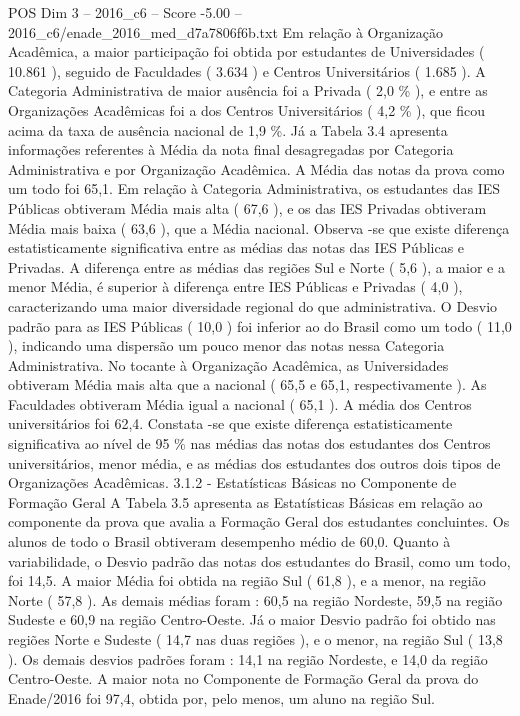 \begin{textsample}{POS Dim 3 – 2016\_c6 – Score -5.00 – 2016\_c6/enade\_2016\_med\_d7a7806f6b.txt}
Em relação à Organização Acadêmica, a maior participação foi obtida por estudantes de Universidades ( 10.861 ), seguido de Faculdades ( 3.634 ) e Centros Universitários ( 1.685 ).
A Categoria Administrativa de maior ausência foi a Privada ( 2,0 \% ), e entre as Organizações Acadêmicas foi a dos Centros Universitários ( 4,2 \% ), que ficou acima da taxa de ausência nacional de 1,9 \%.
Já a Tabela 3.4 apresenta informações referentes à Média da nota final desagregadas por Categoria Administrativa e por Organização Acadêmica.
A Média das notas da prova como um todo foi 65,1.
Em relação à Categoria Administrativa, os estudantes das IES Públicas obtiveram Média mais alta ( 67,6 ), e os das IES Privadas obtiveram Média mais baixa ( 63,6 ), que a Média nacional.
Observa -se que existe diferença estatisticamente significativa entre as médias das notas das IES Públicas e Privadas.
A diferença entre as médias das regiões Sul e Norte ( 5,6 ), a maior e a menor Média, é superior à diferença entre IES Públicas e Privadas ( 4,0 ), caracterizando uma maior diversidade regional do que administrativa.
O Desvio padrão para as IES Públicas ( 10,0 ) foi inferior ao do Brasil como um todo ( 11,0 ), indicando uma dispersão um pouco menor das notas nessa Categoria Administrativa.
No tocante à Organização Acadêmica, as Universidades obtiveram Média mais alta que a nacional ( 65,5 e 65,1, respectivamente ).
As Faculdades obtiveram Média igual a nacional ( 65,1 ).
A média dos Centros universitários foi 62,4.
Constata -se que existe diferença estatisticamente significativa ao nível de 95 \% nas médias das notas dos estudantes dos Centros universitários, menor média, e as médias dos estudantes dos outros dois tipos de Organizações Acadêmicas. 3.1.2 - Estatísticas Básicas no Componente de Formação Geral A Tabela 3.5 apresenta as Estatísticas Básicas em relação ao componente da prova que avalia a Formação Geral dos estudantes concluintes.
Os alunos de todo o Brasil obtiveram desempenho médio de 60,0.
Quanto à variabilidade, o Desvio padrão das notas dos estudantes do Brasil, como um todo, foi 14,5.
A maior Média foi obtida na região Sul ( 61,8 ), e a menor, na região Norte ( 57,8 ).
As demais médias foram : 60,5 na região Nordeste, 59,5 na região Sudeste e 60,9 na região Centro-Oeste.
Já o maior Desvio padrão foi obtido nas regiões Norte e Sudeste ( 14,7 nas duas regiões ), e o menor, na região Sul ( 13,8 ).
Os demais desvios padrões foram : 14,1 na região Nordeste, e 14,0 da região Centro-Oeste.
A maior nota no Componente de Formação Geral da prova do Enade/2016 foi 97,4, obtida por, pelo menos, um aluno na região Sul.

\end{textsample}
